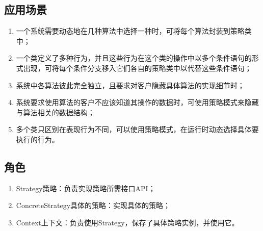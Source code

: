 \subsection{应用场景}
\begin{enumerate}
	\item 一个系统需要动态地在几种算法中选择一种时，可将每个算法封装到策略类中；
	\item 一个类定义了多种行为，并且这些行为在这个类的操作中以多个条件语句的形式出现，可将每个条件分支移入它们各自的策略类中以代替这些条件语句；
	\item 系统中各算法彼此完全独立，且要求对客户隐藏具体算法的实现细节时；
	\item 系统要求使用算法的客户不应该知道其操作的数据时，可使用策略模式来隐藏与算法相关的数据结构；
	\item 多个类只区别在表现行为不同，可以使用策略模式，在运行时动态选择具体要执行的行为。
\end{enumerate}
\subsection{角色}
\begin{enumerate}
	\item Strategy策略：负责实现策略所需接口API；
	\item ConcreteStrategy具体的策略：实现具体的策略；
	\item Context上下文：负责使用Strategy，保存了具体策略实例，并使用它。
\end{enumerate}
